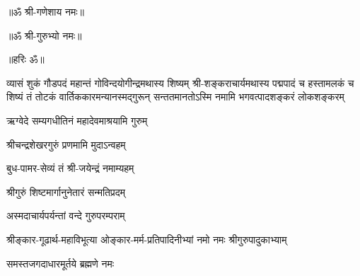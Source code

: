 

\centerline{॥ॐ श्री-गणेशाय नमः॥}
\centerline{॥ॐ श्री-गुरुभ्यो नमः॥}
\centerline{॥हरिः ॐ॥}


\setlength{\shlokaspaceskip}{0pt}
%
{व्यासं शुकं गौडपदं महान्तं गोविन्दयोगीन्द्रमथास्य शिष्यम्}%
{श्री-शङ्कराचार्यमथास्य पद्मपादं च हस्तामलकं च शिष्यं}%
{तं तोटकं वार्तिककारमन्यानस्मद्गुरून् सन्ततमानतोऽस्मि}%
\setlength{\shlokaspaceskip}{24pt}
{नमामि भगवत्पादशङ्करं लोकशङ्करम्}

{ऋग्वेदे सम्यगधीतिनं महादेवमाश्रयामि गुरुम्}

{श्रीचन्द्रशेखरगुरुं प्रणमामि मुदाऽन्वहम्}

{बुध-पामर-सेव्यं तं श्री-जयेन्द्रं नमाम्यहम्}

{श्रीगुरुं शिष्टमार्गानुनेतारं सन्मतिप्रदम्}

{अस्मदाचार्यपर्यन्तां वन्दे गुरुपरम्पराम्}

{श्रीङ्कार-गूढार्थ-महाविभूत्या}
{ओङ्कार-मर्म-प्रतिपादिनीभ्यां}
{नमो नमः श्रीगुरुपादुकाभ्याम्}

{समस्तजगदाधारमूर्तये ब्रह्मणे नमः}
